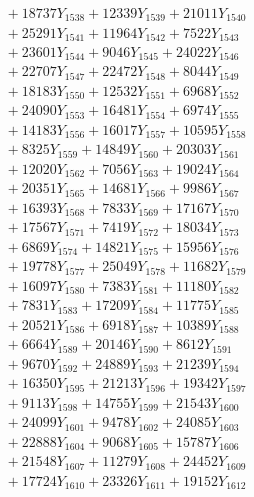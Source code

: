 \documentclass[a4paper,10pt]{article}
\begin{document}
{\begin{align}
&\;  + 18737 Y_{1538} + 12339 Y_{1539} + 21011 Y_{1540} \\[0.3ex]
&\;  + 25291 Y_{1541} + 11964 Y_{1542} + 7522 Y_{1543} \\[0.3ex]
&\;  + 23601 Y_{1544} + 9046 Y_{1545} + 24022 Y_{1546} \\[0.3ex]
&\;  + 22707 Y_{1547} + 22472 Y_{1548} + 8044 Y_{1549} \\[0.3ex]
&\;  + 18183 Y_{1550} + 12532 Y_{1551} + 6968 Y_{1552} \\[0.3ex]
&\;  + 24090 Y_{1553} + 16481 Y_{1554} + 6974 Y_{1555} \\[0.3ex]
&\;  + 14183 Y_{1556} + 16017 Y_{1557} + 10595 Y_{1558} \\[0.5ex]\allowbreak
&\;  + 8325 Y_{1559} + 14849 Y_{1560} + 20303 Y_{1561} \\[0.3ex]
&\;  + 12020 Y_{1562} + 7056 Y_{1563} + 19024 Y_{1564} \\[0.3ex]
&\;  + 20351 Y_{1565} + 14681 Y_{1566} + 9986 Y_{1567} \\[0.3ex]
&\;  + 16393 Y_{1568} + 7833 Y_{1569} + 17167 Y_{1570} \\[0.3ex]
&\;  + 17567 Y_{1571} + 7419 Y_{1572} + 18034 Y_{1573} \\[0.3ex]
&\;  + 6869 Y_{1574} + 14821 Y_{1575} + 15956 Y_{1576} \\[0.3ex]
&\;  + 19778 Y_{1577} + 25049 Y_{1578} + 11682 Y_{1579} \\[0.3ex]
&\;  + 16097 Y_{1580} + 7383 Y_{1581} + 11180 Y_{1582} \\[0.3ex]
&\;  + 7831 Y_{1583} + 17209 Y_{1584} + 11775 Y_{1585} \\[0.3ex]
&\;  + 20521 Y_{1586} + 6918 Y_{1587} + 10389 Y_{1588} \\[0.5ex]\allowbreak
&\;  + 6664 Y_{1589} + 20146 Y_{1590} + 8612 Y_{1591} \\[0.3ex]
&\;  + 9670 Y_{1592} + 24889 Y_{1593} + 21239 Y_{1594} \\[0.3ex]
&\;  + 16350 Y_{1595} + 21213 Y_{1596} + 19342 Y_{1597} \\[0.3ex]
&\;  + 9113 Y_{1598} + 14755 Y_{1599} + 21543 Y_{1600} \\[0.3ex]
&\;  + 24099 Y_{1601} + 9478 Y_{1602} + 24085 Y_{1603} \\[0.3ex]
&\;  + 22888 Y_{1604} + 9068 Y_{1605} + 15787 Y_{1606} \\[0.3ex]
&\;  + 21548 Y_{1607} + 11279 Y_{1608} + 24452 Y_{1609} \\[0.3ex]
&\;  + 17724 Y_{1610} + 23326 Y_{1611} + 19152 Y_{1612} \\[0.3ex]

\end{align}}
\end{document}
